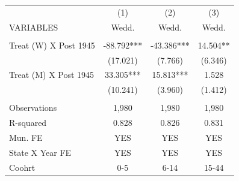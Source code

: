 \begin{tabular}{lccc} \hline
 & (1) & (2) & (3) \\
VARIABLES & Wedd. & Wedd. & Wedd. \\ \hline
 &  &  &  \\
Treat (W) X Post 1945 & -88.792*** & -43.386*** & 14.504** \\
 & (17.021) & (7.766) & (6.346) \\
Treat (M) X Post 1945 & 33.305*** & 15.813*** & 1.528 \\
 & (10.241) & (3.960) & (1.412) \\
 &  &  &  \\
Observations & 1,980 & 1,980 & 1,980 \\
R-squared & 0.828 & 0.826 & 0.831 \\
Mun. FE & YES & YES & YES \\
State X Year FE & YES & YES & YES \\
 Coohrt & 0-5 & 6-14 & 15-44 \\ \hline
\end{tabular}
